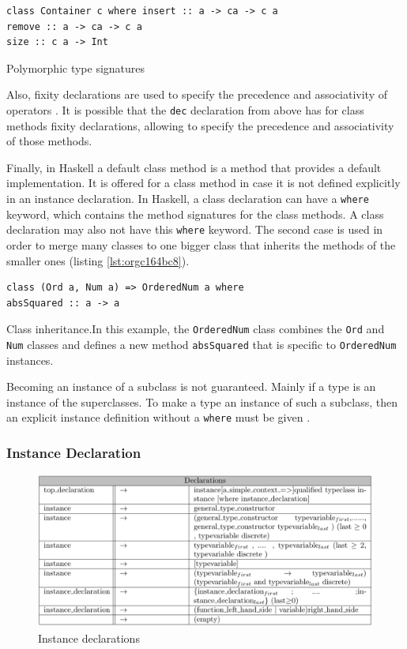 \documentclass[a4paper, titlepage, twoside]{article}
\begin{document}
\begin{listing}[htbp]
\begin{verbatim}
class Container c where insert :: a -> ca -> c a
remove :: a -> ca -> c a
size :: c a -> Int
\end{verbatim}
\caption{\label{lst:org117d95f}Polymorphic type signatures}
\end{listing}

Also, fixity declarations are used to specify the precedence and associativity of operators \autocite{marlowHaskell2010Language2010}. It is possible that the \texttt{dec} declaration from above has for class methods fixity declarations, allowing to specify the precedence and associativity of those methods.

Finally, in Haskell a default class method is a method that provides a default implementation. It is offered for a class method in case it is not defined explicitly in an instance declaration. In Haskell, a class declaration can have a \texttt{where} keyword, which contains the method signatures for the class methods. A class declaration may also not have this \texttt{where} keyword. The second case is used in order to merge many classes to one bigger class that inherits the methods of the smaller ones (listing \ref{lst:orgc164bc8}).

\begin{listing}[htbp]
\begin{verbatim}
class (Ord a, Num a) => OrderedNum a where
absSquared :: a -> a
\end{verbatim}
\caption[Class inheritance]{\label{lst:orgc164bc8}Class inheritance.In this example, the \texttt{OrderedNum} class combines the \texttt{Ord} and \texttt{Num} classes and defines a new method \texttt{absSquared} that is specific to \texttt{OrderedNum} instances.}
\end{listing}

Becoming an instance of a subclass is not guaranteed. Mainly if a type is an instance of the superclasses. To make a type an instance of such a subclass, then an explicit instance definition without a \texttt{where} must be given \autocite{marlowHaskell2010Language2010}.

\subsubsection{Instance Declaration}
\label{sec:orgbc38d21}

\begin{figure}[htbp]
\centering
\includegraphics[width=.9\linewidth]{img/2023-05-25_18-46-02_screenshot.png}
\caption{Instance declarations}
\end{figure}
\end{document}
